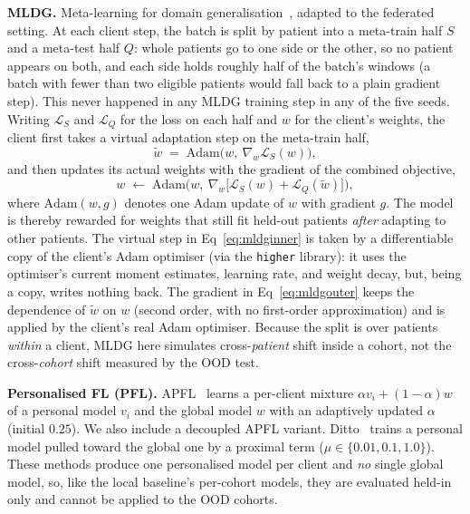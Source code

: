 \documentclass[10pt,letterpaper]{article}
\begin{document}
\textbf{MLDG.} Meta-learning for domain generalisation~\cite{li2018mldg},
adapted to the federated setting. At each client step, the batch is split by
patient into a meta-train half $S$ and a meta-test half $Q$: whole patients go
to one side or the other, so no patient appears on both, and each side holds
roughly half of the batch's windows (a batch with fewer than two eligible
patients would fall back to a plain gradient step). This never happened in
any MLDG training step in any of the five seeds. Writing
$\mathcal{L}_S$ and $\mathcal{L}_Q$ for the loss on each half and $w$ for the
client's weights, the client first takes a virtual adaptation step on the
meta-train half,
\begin{equation}\label{eq:mldginner}
\tilde{w} \;=\; \mathrm{Adam}\big(w,\ \nabla_w \mathcal{L}_S(w)\big),
\end{equation}
and then updates its actual weights with the gradient of the combined
objective,
\begin{equation}\label{eq:mldgouter}
w \;\leftarrow\; \mathrm{Adam}\big(w,\ \nabla_w\big[\mathcal{L}_S(w) +
\mathcal{L}_Q(\tilde{w})\big]\big),
\end{equation}
where $\mathrm{Adam}(w, g)$ denotes one Adam update of $w$ with gradient $g$.
The model is thereby rewarded for weights that still fit held-out patients
\emph{after} adapting to other patients. The virtual step in
Eq~\eqref{eq:mldginner} is taken by a differentiable copy of the client's Adam
optimiser (via the \texttt{higher} library): it uses the optimiser's current
moment estimates, learning rate, and weight decay, but, being a copy,
writes nothing back. The gradient in Eq~\eqref{eq:mldgouter} keeps the
dependence of $\tilde{w}$ on $w$ (second order, with no first-order approximation)
and is applied by the client's real Adam optimiser. Because the split is over
patients \emph{within} a client, MLDG here simulates cross-\emph{patient}
shift inside a cohort, not the cross-\emph{cohort} shift measured by the OOD
test.

\textbf{Personalised FL (PFL).} APFL~\cite{deng2020apfl} learns a per-client
mixture $\alpha v_i + (1-\alpha)w$ of a personal model $v_i$ and the global
model $w$ with an adaptively updated $\alpha$ (initial $0.25$). We also include
a decoupled APFL variant. Ditto~\cite{li2021ditto} trains a personal model
pulled toward the global one by a proximal term ($\mu\in\{0.01,0.1,1.0\}$). These methods produce one personalised
model per client and \emph{no} single global model, so, like the local
baseline's per-cohort models, they are evaluated held-in only and cannot be
applied to the OOD cohorts.
\end{document}

